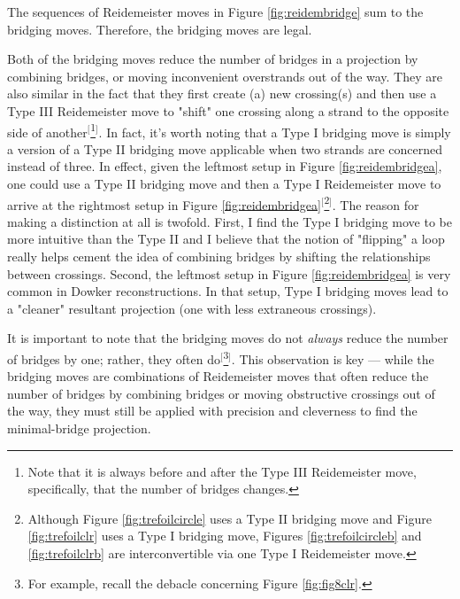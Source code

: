 \documentclass[titlepage]{article}
\begin{document}
The sequences of Reidemeister moves in Figure \ref{fig:reidembridge} sum to the bridging moves. Therefore, the bridging moves are legal.\par
Both of the bridging moves reduce the number of bridges in a projection by combining bridges, or moving inconvenient overstrands out of the way. They are also similar in the fact that they first create (a) new crossing(s) and then use a Type III Reidemeister move to "shift" one crossing along a strand to the opposite side of another$^[$\footnote{Note that it is always before and after the Type III Reidemeister move, specifically, that the number of bridges changes.}$^]$. In fact, it's worth noting that a Type I bridging move is simply a version of a Type II bridging move applicable when two strands are concerned instead of three. In effect, given the leftmost setup in Figure \ref{fig:reidembridgea}, one could use a Type II bridging move and then a Type I Reidemeister move to arrive at the rightmost setup in Figure \ref{fig:reidembridgea}$^[$\footnote{Although Figure \ref{fig:trefoilcircle} uses a Type II bridging move and Figure \ref{fig:trefoilclr} uses a Type I bridging move, Figures \ref{fig:trefoilcircleb} and \ref{fig:trefoilclrb} are interconvertible via one Type I Reidemeister move.}$^]$. The reason for making a distinction at all is twofold. First, I find the Type I bridging move to be more intuitive than the Type II and I believe that the notion of "flipping" a loop really helps cement the idea of combining bridges by shifting the relationships between crossings. Second, the leftmost setup in Figure \ref{fig:reidembridgea} is very common in Dowker reconstructions. In that setup, Type I bridging moves lead to a "cleaner" resultant projection (one with less extraneous crossings).\par
It is important to note that the bridging moves do not \emph{always} reduce the number of bridges by one; rather, they often do$^[$\footnote{For example, recall the debacle concerning Figure \ref{fig:fig8clr}.}$^]$. This observation is key --- while the bridging moves are combinations of Reidemeister moves that often reduce the number of bridges by combining bridges or moving obstructive crossings out of the way, they must still be applied with precision and cleverness to find the minimal-bridge projection.\par
\end{document}
